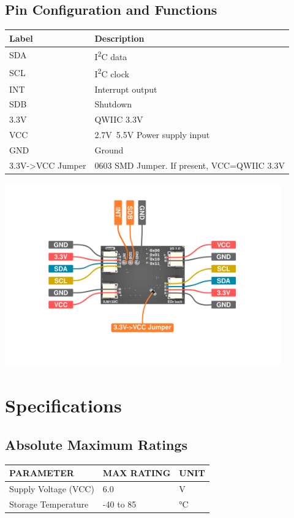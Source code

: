 \documentclass[10pt]{article}
\newcommand{\sectionbreak}{\clearpage}
\begin{document}
	\subsection{Pin Configuration and Functions}\label{sec:overview.2}
	\begin{tabularx}{\textwidth}{|l|X|}
		\hline
		\rowcolor{gray!25}\textbf{Label} & \textbf{Description} \\ \hline
		SDA & I\textsuperscript{2}C data \\ \hline
		SCL & I\textsuperscript{2}C clock \\ \hline
		INT & Interrupt output \\ \hline
		SDB & Shutdown \\ \hline
		3.3V & QWIIC 3.3V \\ \hline
		VCC & 2.7V~5.5V Power supply input \\ \hline
		GND & Ground \\ \hline
		3.3V->VCC Jumper & 0603 SMD Jumper. If present, VCC=QWIIC 3.3V \\ \hline
	\end{tabularx}
	\label{tab:rev}
	\begin{center}
		\includegraphics[width=450px]{../visual/ILM139C_pinout.png}\label{fig:component}
	\end{center}
	
	
	\sectionbreak
	
	\section{Specifications}\label{sec:specs}
	\subsection{Absolute Maximum Ratings}\label{sec:specs.1}
	\begin{tabularx}{\textwidth}{|X|X|X|}
		\hline
		\rowcolor{gray!25}\textbf{PARAMETER} & \textbf{MAX RATING} & \textbf{UNIT} \\ \hline
		Supply Voltage (VCC) & 6.0 & V \\ \hline
		Storage Temperature & -40 to 85 & °C \\ \hline
	\end{tabularx}
	\label{tab:amax}
	
\end{document}
